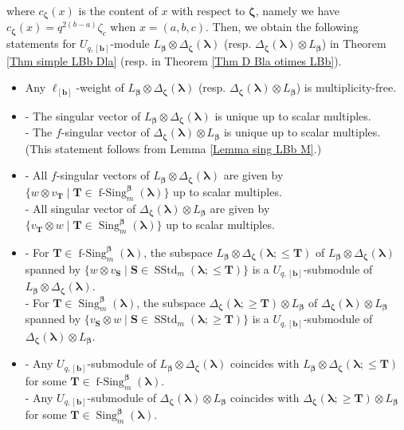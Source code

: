 \documentclass[12pt]{amsart}
\numberwithin{equation}{thm}
\newcommand\bS{\mathbf S}
\newcommand\bT{\mathbf T}
\newcommand\bb{\mathbf b}
\newcommand\z{\zeta}
\newcommand\D{\Delta}
\newcommand\Bb{\boldsymbol\beta}
\newcommand\Bz{\boldsymbol\zeta}
\newcommand\Bla{\boldsymbol\lambda}
\newcommand{\SStd}{\operatorname{SStd}}
\newcommand{\Sing}{\operatorname{Sing}}
\newcommand{\fSing}{\operatorname{f-Sing}}
\newcounter{ni}
\begin{document}
where $c_{\Bz}(x)$ is the content of $x$ with respect to $\Bz$, 
namely we have 
$c_{\Bz} (x) = q^{2 (b-a)} \z_{c}$ when $x=(a,b,c)$. 
Then, 
we obtain the following statements for $U_{q,[\bb]}$-module $L_{\Bb} \otimes \D_{\Bz}(\Bla)$ 
(resp. $\D_{\Bz} (\Bla) \otimes L_{\Bb}$) 
in Theorem \ref{Thm simple LBb Dla} (resp. in Theorem \ref{Thm D Bla otimes LBb}). 
\begin{itemize}
\item 
Any $\ell_{[\bb]}$-weight of $L_{\Bb} \otimes \D_{\Bz} (\Bla)$ (resp. $\D_{\Bz} (\Bla) \otimes L_{\Bb}$) 
is multiplicity-free. 

\item 
- The singular vector of $L_{\Bb} \otimes \D_{\Bz}(\Bla)$ is unique up to scalar multiples.  
\\
- The $f$-singular vector of $\D_{\Bz} (\Bla) \otimes L_{\Bb}$ is unique up to scalar multiples. 
\\
(This statement follows from Lemma \ref{Lemma sing LBb M}.)  

\item 
- All $f$-singular vectors of $L_{\Bb} \otimes \D_{\Bz} (\Bla)$ 
	are given by $\{ w \otimes v_{\bT} \mid \bT \in \fSing_m^{\Bb} (\Bla)\}$ 
	up to scalar multiples.  
\\
- All singular vector of $\D_{\Bz}(\Bla) \otimes L_{\Bb}$ 
	are given by $\{ v_{\bT} \otimes w \mid \bT \in \Sing_m^{\Bb} (\Bla)\}$ 
	up to scalar multiples.
	
\item 
- For $\bT \in \fSing_m^{\Bb} (\Bla)$, 
	the subspace $L_{\Bb} \otimes \D_{\Bz} (\Bla ; \leq \bT)$ of $L_{\Bb} \otimes \D_{\Bz} (\Bla)$ 
	spanned by $\{w \otimes v_{\bS} \mid \bS \in \SStd_m (\Bla ; \leq \bT)\}$ 
	is a $U_{q,[\bb]}$-submodule of $L_{\Bb} \otimes \D_{\Bz} (\Bla)$. 
\\
- For $\bT \in \Sing_m^{\Bb} (\Bla)$, 
	the subspace $\D_{\Bz} (\Bla ; \geq \bT) \otimes L_{\Bb}$ of $\D_{\Bz} (\Bla) \otimes L_{\Bb}$ 
	spanned by $\{v_{\bS} \otimes w \mid \bS \in \SStd_m (\Bla ; \geq \bT)\}$ 
	is a $U_{q,[\bb]}$-submodule of $\D_{\Bz} (\Bla) \otimes L_{\Bb}$. 

\item 
- Any $U_{q,[\bb]}$-submodule of $L_{\Bb} \otimes \D_{\Bz} (\Bla)$  coincides with 
	 $L_{\Bb} \otimes \D_{\Bz} (\Bla ; \leq \bT)$ for some $\bT \in \fSing_m^{\Bb} (\Bla)$. 
\\
- Any $U_{q,[\bb]}$-submodule of $\D_{\Bz} (\Bla) \otimes L_{\Bb}$ coincides with 
	$\D_{\Bz} (\Bla ; \geq \bT) \otimes L_{\Bb}$ for some $\bT \in \Sing_m^{\Bb} (\Bla)$. 


\end{itemize}
\end{document}

